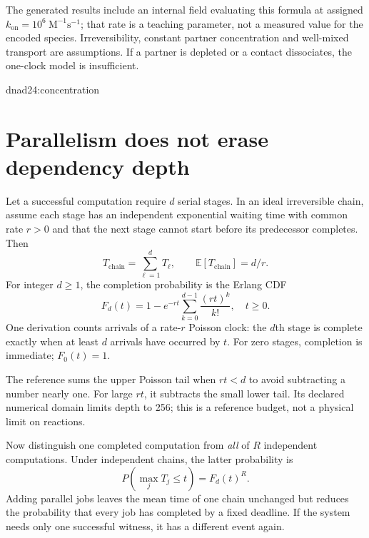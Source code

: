 The generated results include an internal field evaluating this formula at assigned
$k_{\mathrm{on}}=10^6\ \mathrm{M}^{-1}\mathrm{s}^{-1}$; that rate is a teaching
parameter, not a measured value for the encoded species. Irreversibility,
constant partner concentration and well-mixed transport are assumptions. If a
partner is depleted or a contact dissociates, the one-clock model is insufficient.

{dnad24:concentration}

\section{Parallelism does not erase dependency depth}
Let a successful computation require $d$ serial stages. In an ideal irreversible
chain, assume each stage has an independent exponential waiting time with common
rate $r>0$ and that the next stage cannot start before its predecessor completes.
Then
\[
T_{\mathrm{chain}}=\sum_{\ell=1}^{d}T_\ell,\qquad
\mathbb E[T_{\mathrm{chain}}]=d/r.
\]
For integer $d\ge1$, the completion probability is the Erlang CDF
\begin{equation}
F_d(t)=1-e^{-rt}\sum_{k=0}^{d-1}\frac{(rt)^k}{k!},
\quad t\ge0.
\label{dnad24:erlang}
\end{equation}
One derivation counts arrivals of a rate-$r$ Poisson clock: the $d$th stage is
complete exactly when at least $d$ arrivals have occurred by $t$.
For zero stages, completion is immediate; $F_0(t)=1$.

The reference sums the upper Poisson tail when $rt<d$ to avoid subtracting a
number nearly one. For large $rt$, it subtracts the small lower tail.
Its declared numerical domain limits depth to 256; this is a reference budget,
not a physical limit on reactions.

Now distinguish one completed computation from \emph{all} of $R$ independent
computations. Under independent chains, the latter probability is
\[
P(\max_jT_j\le t)=F_d(t)^R.
\]
Adding parallel jobs leaves the mean time of one chain unchanged but reduces the
probability that every job has completed by a fixed deadline.
If the system needs only one successful witness, it has a different event again.


